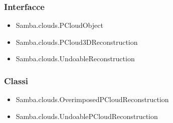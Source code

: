 \subsubsection{Interfacce}
\begin{itemize}
	\item Samba.clouds.PCloudObject
	\item Samba.clouds.PCloud3DReconstruction
	\item Samba.clouds.UndoableReconstruction
\end{itemize}
\subsubsection{Classi}
\begin{itemize}
	\item Samba.clouds.OverimposedPCloudReconstruction
	\item Samba.clouds.UndoablePCloudReconstruction
\end{itemize}



\ \\ \ \\ \ \\ \ \\ \ \\ \ \\ \ \\ \ \\




